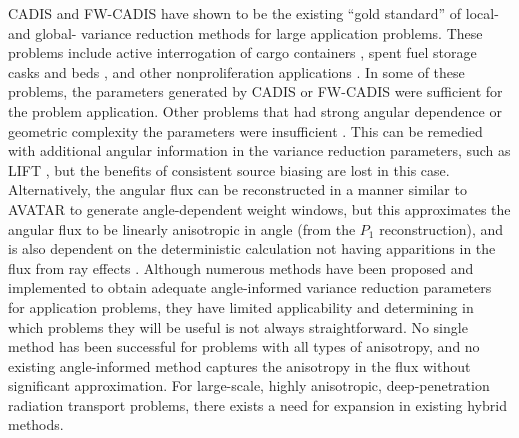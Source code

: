 CADIS and FW-CADIS have shown to be the existing ``gold standard'' of local- and
global- variance reduction methods for large application problems.
These problems include active interrogation of cargo containers
\cite{mosher_automated_2009}, spent fuel storage casks \cite{chen_surface_2011,
radulescu_dose_2013}
and beds \cite{sheu_dose_2011}, and other nonproliferation applications
\cite{somasundaram_implementation_2013}. In some of these problems, the
parameters generated by CADIS or FW-CADIS were sufficient for the problem
application. Other problems that had strong angular dependence or geometric
complexity the parameters were insufficient \cite{chen_surface_2011,
somasundaram_implementation_2013, peplow_consistent_2012}.
This can be remedied with additional angular
information in the variance reduction parameters, such as LIFT
\cite{somasundaram_implementation_2013}, but the benefits of consistent source
biasing are lost in this case. Alternatively, the angular flux can be
reconstructed in a manner similar to AVATAR
\cite{sweezy_automated_2005, peplow_consistent_2012} to generate angle-dependent
weight windows, but this approximates the angular flux to be linearly
anisotropic in angle (from the $P_1$ reconstruction), and is also dependent on
the deterministic calculation not having apparitions in the flux from ray
effects \cite{sweezy_automated_2005}. Although numerous methods have been
proposed and implemented to obtain adequate angle-informed variance reduction
parameters for application problems, they have limited applicability
\cite{peplow_consistent_2012} and determining in which problems they will be
useful is not always straightforward. No single method has been successful
for problems with all types of anisotropy, and no existing angle-informed method
captures the anisotropy in the flux without significant approximation. For
large-scale, highly anisotropic, deep-penetration radiation transport problems,
there exists a need for expansion in existing hybrid methods.

